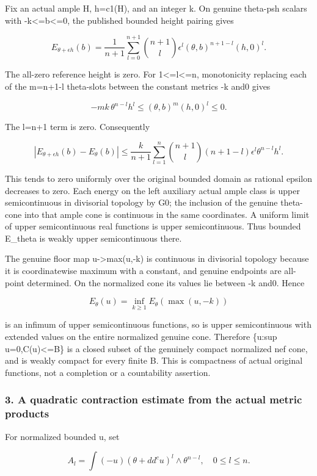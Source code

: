 \documentclass[
]{article}
\begin{document}
Fix an actual ample H, h=c1(H), and an integer k. On genuine theta-psh
scalars with -k\textless=b\textless=0, the published bounded height
pairing gives

\[E_{\theta+\epsilon h}(b)
=\frac1{n+1}\sum_{l=0}^{n+1}\binom{n+1}l\epsilon^l
(\theta,b)^{n+1-l}(h,0)^l.\]

The all-zero reference height is zero. For 1\textless=l\textless=n,
monotonicity replacing each of the m=n+1-l theta-slots between the
constant metrics -k and0 gives

\[-mk\,\theta^{n-l}h^l
\le(\theta,b)^m(h,0)^l\le0.\]

The l=n+1 term is zero. Consequently

\[|E_{\theta+\epsilon h}(b)-E_\theta(b)|
\le\frac{k}{n+1}\sum_{l=1}^n
\binom{n+1}l(n+1-l)\epsilon^l\theta^{n-l}h^l.\]

This tends to zero uniformly over the original bounded domain as
rational epsilon decreases to zero. Each energy on the left auxiliary
actual ample class is upper semicontinuous in divisorial topology by G0;
the inclusion of the genuine theta-cone into that ample cone is
continuous in the same coordinates. A uniform limit of upper
semicontinuous real functions is upper semicontinuous. Thus bounded
E\_theta is weakly upper semicontinuous there.

The genuine floor map u-\textgreater max(u,-k) is continuous in
divisorial topology because it is coordinatewise maximum with a
constant, and genuine endpoints are all-point determined. On the
normalized cone its values lie between -k and0. Hence

\[E_\theta(u)=\inf_{k\ge1}E_\theta(\max(u,-k))\]

is an infimum of upper semicontinuous functions, so is upper
semicontinuous with extended values on the entire normalized genuine
cone. Therefore \{u:sup u=0,C(u)\textless=B\} is a closed subset of the
genuinely compact normalized nef cone, and is weakly compact for every
finite B. This is compactness of actual original functions, not a
completion or a countability assertion.

\subsubsection{3. A quadratic contraction estimate from the actual
metric
products}\label{a-quadratic-contraction-estimate-from-the-actual-metric-products}

For normalized bounded u, set

\[A_l=\int(-u)(\theta+dd^cu)^l\wedge\theta^{n-l},\quad0\le l\le n.\]
\end{document}
